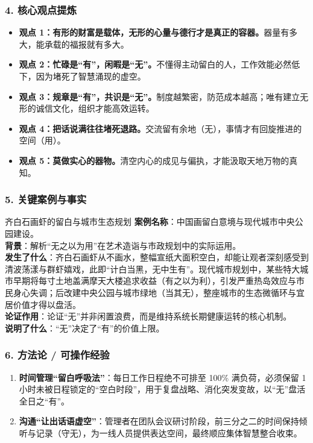 \subsubsection{4. 核心观点提炼}
\begin{itemize}
    \item \textbf{观点 1：有形的财富是载体，无形的心量与德行才是真正的容器。}器量有多大，能承载的福报就有多大。
    \item \textbf{观点 2：忙碌是“有”，闲暇是“无”。}不懂得主动留白的人，工作效能必然低下，因为堵死了智慧涌现的虚空。
    \item \textbf{观点 3：规章是“有”，共识是“无”。}制度越繁密，防范成本越高；唯有建立无形的诚信文化，组织才能高效运转。
    \item \textbf{观点 4：把话说满往往堵死退路。}交流留有余地（无），事情才有回旋推进的空间（用）。
    \item \textbf{观点 5：莫做实心的器物。}清空内心的成见与偏执，才能汲取天地万物的真知。
\end{itemize}

\subsubsection{5. 关键案例与事实}
\begin{CaseBox}{齐白石画虾的留白与城市生态规划}
\textbf{案例名称}：中国画留白意境与现代城市中央公园建设。\\
\textbf{背景}：解析“无之以为用”在艺术造诣与市政规划中的实际运用。\\
\textbf{发生了什么}：齐白石画虾从不画水，整幅宣纸大面积空白，却能让观者深刻感受到清波荡漾与群虾嬉戏，此即“计白当黑，无中生有”。现代城市规划中，某些特大城市早期将每寸土地盖满摩天大楼追求收益（有之以为利），引发严重热岛效应与市民身心失调；后改建中央公园与城市绿地（当其无），整座城市的生态微循环与宜居价值才得以盘活。\\
\textbf{论证作用}：论证“无”并非闲置浪费，而是维持系统长期健康运转的核心机制。\\
\textbf{说明了什么}：“无”决定了“有”的价值上限。
\end{CaseBox}

\subsubsection{6. 方法论 / 可操作经验}
\begin{enumerate}
    \item \textbf{时间管理“留白呼吸法”}：每日工作日程绝不可排至 100\% 满负荷，必须保留 1 小时未被日程锁定的“空白时段”，用于复盘战略、消化突发变故，以“无”盘活全日之“有”。
    \item \textbf{沟通“让出话语虚空”}：管理者在团队会议研讨阶段，前三分之二的时间保持倾听与记录（守无），为一线人员提供表达空间，最终顺应集体智慧整合收束。
\end{enumerate}

